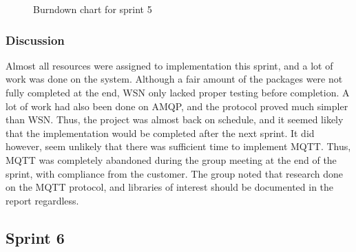 \begin{center}
  \begin{figure}[ht!]
    \caption{Burndown chart for sprint 5}
    \label{fig:sprint 5, burndown}
  \end{figure}
\end{center}


\subsubsection{Discussion}
\label{subsec:project_lifecycle-development-sprint_5-discussion}

Almost all resources were assigned to implementation this sprint, and a lot of work was done on the system. Although a fair amount of the packages were not fully completed at the end, WSN only lacked proper testing before completion. A lot of work had also been done on AMQP, and the protocol proved much simpler than WSN. Thus, the project was almost back on schedule, and it seemed likely that the implementation would be completed after the next sprint. It did however, seem unlikely that there was sufficient time to implement MQTT. Thus, MQTT was completely abandoned during the group meeting at the end of the sprint, with compliance from the customer. The group noted that research done on the MQTT protocol, and libraries of interest should be documented in the report regardless.

\subsection{Sprint 6}
\label{subsec:project_lifecycle-development-sprint_6}


